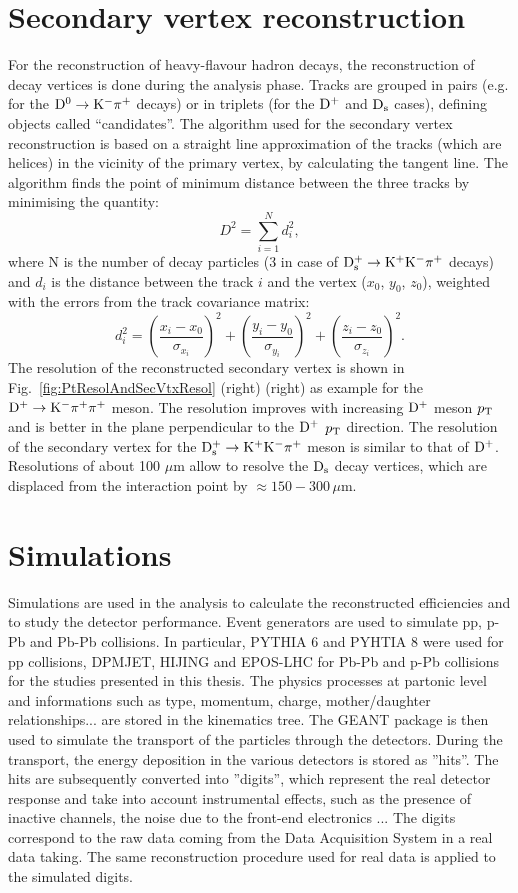 \section{Secondary vertex reconstruction}
For the reconstruction of heavy-flavour hadron decays, the reconstruction of decay vertices 
is done during the analysis phase. Tracks are grouped in pairs (e.g. for the ${\rm D^0\to K^-\pi^+}$ decays) or in triplets (for the ${\rm D^+}$ and ${\rm D_s}$ cases), 
defining objects called ``candidates''. 
The algorithm used for the secondary vertex reconstruction is based on a straight 
line approximation of the tracks (which are helices) in the vicinity of the primary vertex, by calculating the tangent line.
The algorithm finds the point of minimum distance between the three tracks by minimising the quantity:
\begin{equation}
D^2= \sum_{i=1}^N d_i^2,
\end{equation}
where N is the number of decay particles (3 in case of ${\rm D^{+}_\mathrm{s}\to K^+ K^-\pi^+}$ decays) and $d_i$ is the distance between the track $i$ and the vertex 
($x_0$, $y_0$, $z_0$), weighted with the errors from the track covariance matrix:
\begin{equation}
d^2_i=\left(\frac{x_i-x_0}{\sigma_{x_i}}\right)^2+
\left(\frac{y_i-y_0}{\sigma_{y_i}}\right)^2+\left(\frac{z_i-z_0}{\sigma_{z_i}}\right)^2.
\end{equation}
The resolution of the reconstructed secondary vertex is shown in Fig.~\ref{fig:PtResolAndSecVtxResol} (right) 
(right) as example for the ${\rm D}^+\to {\rm K}^-\pi^+\pi^+$ meson. The 
resolution improves with increasing ${\rm D^+}$ meson $p_{\rm T}$ and is better in the plane perpendicular to the ${\rm D^+}$ $p_{\rm T}$ direction.
The resolution of the secondary vertex for the ${\rm D^{+}_\mathrm{s}\to K^+ K^-\pi^+}$ meson is similar to that of ${\rm D^+}$.
Resolutions of about 100 $\mu$m allow to resolve the ${\rm D_s}$ decay vertices, which are
displaced from the interaction point by $\approx 150-300\,\mu$m.


\section{Simulations}
Simulations are used in the analysis to calculate the reconstructed efficiencies and to study the detector
performance.
Event generators are used to simulate pp, p-Pb and Pb-Pb collisions. In particular, PYTHIA 6 and
PYHTIA 8 were used for pp collisions, DPMJET, HIJING and EPOS-LHC for Pb-Pb and p-Pb collisions
for the studies presented in this thesis.
The physics processes at partonic level and informations such as type, momentum, 
charge, mother/daughter relationships... are stored in the kinematics tree. The GEANT package
is then used to simulate the transport of the particles through the
  detectors. During the transport, the energy deposition in the various detectors is stored 
  as ''hits''. The hits are subsequently converted into ''digits'', which represent 
  the real detector response and take into account instrumental effects, such as the presence of inactive channels, the noise 
  due to the front-end electronics ... The digits correspond to the raw data coming from the 
  Data Acquisition System in a real data taking. The same reconstruction procedure used for real data is applied to the simulated
  digits.

